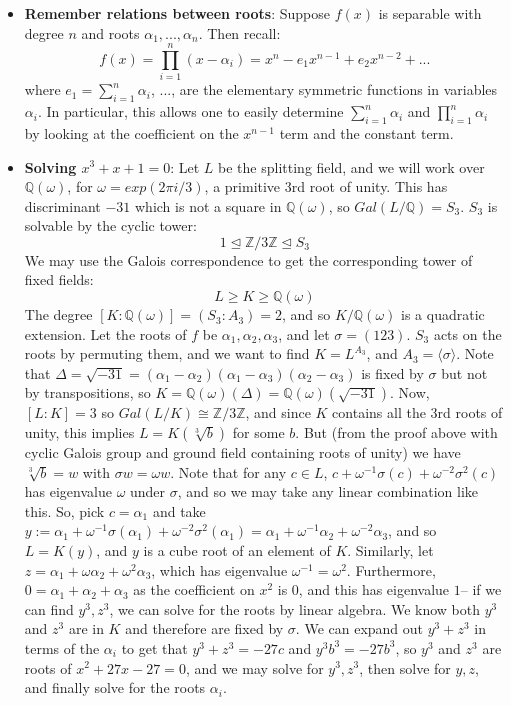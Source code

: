 \documentclass[11pt, oneside]{amsart}   	%
\theoremstyle{definition}
\begin{document}
\begin{itemize}
	\item \textbf{Remember relations between roots}: Suppose $f(x)$ is separable with degree $n$ and roots $\alpha_1, ..., \alpha_n$. Then recall:
	$$
		f(x) = \prod_{i = 1}^n(x - \alpha_i) = x^n - e_1x^{n - 1} + e_2x^{n - 2} + ...
	$$
	where $e_1 = \sum_{i = 1}^n\alpha_i$, ..., are the elementary symmetric functions in variables $\alpha_i$. In particular, this allows one to easily 
	determine $\sum_{i = 1}^n\alpha_i$ and $\prod_{i = 1}^n\alpha_i$ by looking at the coefficient on the $x^{n - 1}$ term and the constant term. 

	\item \textbf{Solving $x^3 + x + 1 = 0$}: Let $L$ be the splitting field, and we will work over $\mathbb Q(\omega)$, for $\omega = exp(2\pi i / 3)$, a 
	primitive 3rd root of unity. This has discriminant $-31$ which is not a square in $\mathbb Q(\omega)$, so $Gal(L /\mathbb Q) = S_3$. $S_3$ is 
	solvable by the cyclic tower:
	$$
		1\trianglelefteq \mathbb Z / 3\mathbb Z\trianglelefteq S_3
	$$
	We may use the Galois correspondence to get the corresponding tower of fixed fields:
	$$
		L\geq K\geq \mathbb Q(\omega)
	$$
	The degree $[K : \mathbb Q(\omega)] = (S_3 : A_3) = 2$, and so $K / \mathbb Q(\omega)$ is a quadratic extension. Let the roots of $f$ be $\alpha_1, 
	\alpha_2, \alpha_3$, and let $\sigma = (123)$. $S_3$ acts on the roots by permuting them, and we want to find $K = L^{A_3}$, and $A_3 = \langle
	\sigma\rangle$. Note that $\Delta = \sqrt{-31} = (\alpha_1 - \alpha_2)(\alpha_1 - \alpha_3)(\alpha_2 - \alpha_3)$ is fixed by $\sigma$ but not by 
	transpositions, so $K = \mathbb Q(\omega)(\Delta) = \mathbb Q(\omega)(\sqrt{-31})$. Now, $[L : K] = 3$ so $Gal(L / K)\cong\mathbb Z / 3\mathbb Z$, 
	 and since $K$ contains all the 3rd roots of unity, this implies $L = K(\sqrt[3]{b})$ for some $b$. But (from the proof above with cyclic Galois group 
	 and ground field containing roots of unity) we have $\sqrt[3]{b} = w$ with $\sigma w = \omega w$. Note that for any $c\in L$, $c + 
	 \omega^{-1}\sigma(c) + \omega^{-2}\sigma^2(c)$ has eigenvalue $\omega$ under $\sigma$, and so we may take any linear combination like this. So, 
	 pick $c = \alpha_1$ and take $y := \alpha_1 +  \omega^{-1}\sigma(\alpha_1) + \omega^{-2}\sigma^2(\alpha_1) = \alpha_1 +  \omega^{-1}\alpha_2 + 
	 \omega^{-2}\alpha_3$, and so $L = K(y)$, and $y$ is a cube root of an element of $K$. Similarly, let $z = \alpha_1 + \omega\alpha_2 + \omega^2
	 \alpha_3$, which has eigenvalue $\omega^{-1} = \omega^2$.  Furthermore, $0 = \alpha_1 + \alpha_2 + \alpha_3$ as the coefficient on $x^2$ is $0$, 
	 and this has eigenvalue $1$-- if we can find $y^3, z^3$, we can solve for the roots by linear algebra. We know both $y^3$ and $z^3$ are in $K$ and 
	 therefore are fixed by $\sigma$. We can expand out $y^3 + z^3$ in terms of the $\alpha_i$ to get that $y^3 + z^3 = -27c$ and $y^3b^3 = -27b^3$, 
	 so $y^3$ and $z^3$ are roots of $x^2 + 27x - 27 = 0$, and we may solve for $y^3, z^3$, then solve for $y, z$, and finally solve for the roots $\alpha_i$.
	

\end{itemize}
\end{document}
